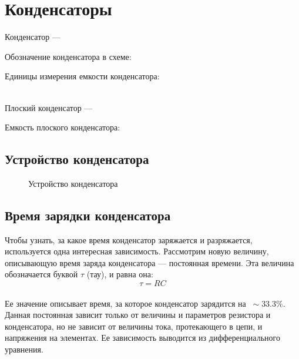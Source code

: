 \section{Конденсаторы}

Конденсатор --- \hrulefill

\hrulefill

\hrulefill

Обозначение конденсатора в схеме:


Единицы измерения емкости конденсатора:

\\
Плоский конденсатор --- \hrulefill

\hrulefill

\hrulefill

Емкость плоского конденсатора:


\subsection{Устройство конденсатора}

\begin{figure}[h]
\centering
{}
\caption{Устройство конденсатора}
\label{fig:capacitor}
\end{figure}


\subsection{Время зарядки конденсатора}
Чтобы узнать, за какое время конденсатор заряжается и разряжается, используется одна интересная зависимость.
Рассмотрим новую величину, описывающую время заряда конденсатора --- постоянная времени. Эта величина обозначается буквой $\tau$ (тау), и равна она:
$$\tau = RC$$
\\
Ее значение описывает время, за которое конденсатор зарядится на $\ \sim \! 33.3\%$.\\
Данная постоянная зависит только от величины и параметров резистора и конденсатора, но не зависит от величины тока, протекающего в цепи, и напряжения на элементах. Ее зависимость выводится из дифференциального уравнения. 

